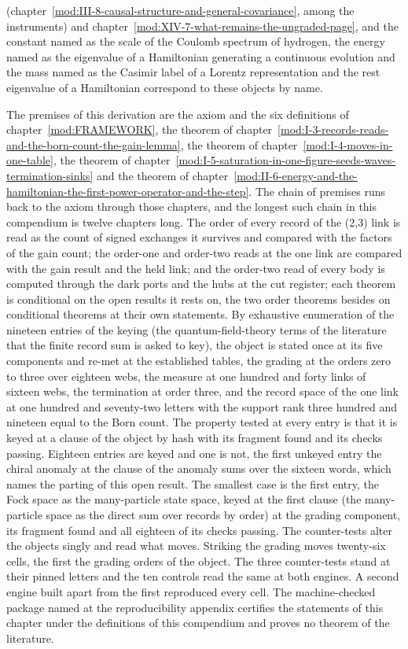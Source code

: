 \begin{chbridge}
(chapter~\ref{mod:III-8-causal-structure-and-general-covariance}, among the instruments) and chapter~\ref{mod:XIV-7-what-remains-the-ungraded-page}, and the constant named as the scale of the Coulomb spectrum of hydrogen, the energy named as the eigenvalue of a Hamiltonian generating a continuous evolution and the mass named as the Casimir label of a Lorentz representation and the rest eigenvalue of a Hamiltonian correspond to these objects by name.
\end{chbridge}
\begin{chproof}[census]
The premises of this derivation are the axiom and the six definitions of chapter~\ref{mod:FRAMEWORK}, the theorem of chapter~\ref{mod:I-3-records-reads-and-the-born-count-the-gain-lemma}, the theorem of chapter~\ref{mod:I-4-moves-in-one-table}, the theorem of chapter~\ref{mod:I-5-saturation-in-one-figure-seeds-waves-termination-sinks} and the theorem of chapter~\ref{mod:II-6-energy-and-the-hamiltonian-the-first-power-operator-and-the-step}. The chain of premises runs back to the axiom through those chapters, and the longest such chain in this compendium is twelve chapters long.
The order of every record of the (2,3) link is read as the count of signed exchanges it survives and compared with the factors of the gain count; the order-one and order-two reads at the one link are compared with the gain result and the held link; and the order-two read of every body is computed through the dark ports and the hubs at the cut register; each theorem is conditional on the open results it rests on, the two order theorems besides on conditional theorems at their own statements.
By exhaustive enumeration of the nineteen entries of the keying (the quantum-field-theory terms of the literature that the finite record sum is asked to key), the object is stated once at its five components and re-met at the established tables, the grading at the orders zero to three over eighteen webs, the measure at one hundred and forty links of sixteen webs, the termination at order three, and the record space of the one link at one hundred and seventy-two letters with the support rank three hundred and nineteen equal to the Born count. The property tested at every entry is that it is keyed at a clause of the object by hash with its fragment found and its checks passing. Eighteen entries are keyed and one is not, the first unkeyed entry the chiral anomaly at the clause of the anomaly sums over the sixteen words, which names the parting of this open result. The smallest case is the first entry, the Fock space as the many-particle state space, keyed at the first clause (the many-particle space as the direct sum over records by order) at the grading component, its fragment found and all eighteen of its checks passing.
The counter-tests alter the objects singly and read what moves. Striking the grading moves twenty-six cells, the first the grading orders of the object. The three counter-tests stand at their pinned letters and the ten controls read the same at both engines. A second engine built apart from the first reproduced every cell.
The machine-checked package named at the reproducibility appendix certifies the statements of this chapter under the definitions of this compendium and proves no theorem of the literature.
\end{chproof}
